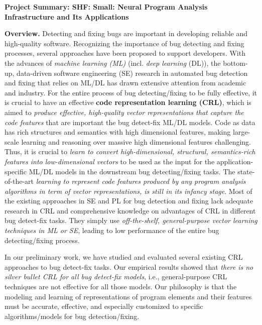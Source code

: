\documentclass[11pt]{article}
\begin{document}

\begin{center}
  {\bf Project Summary: SHF: Small: Neural Program Analysis Infrastructure and Its Applications}
\end{center}
\vspace{-.1in}


{\bf Overview.}
Detecting and fixing bugs are important in developing reliable and
high-quality software. Recognizing the importance of bug detecting and fixing processes,
several approaches have been proposed to support developers. With the
advances of {\em machine learning (ML)} (incl. {\em deep learning}
(DL)), the bottom-up, data-driven software engineering (SE) research
in automated bug detection and fixing that relies on ML/DL has drawn
extensive attention from academic and industry. For the entire process
of bug detecting/fixing to be fully effective, it is crucial to have
an effective {\bf code representation learning (CRL)}, which is aimed
to {\em produce effective, high-quality vector representations that
  capture the code features} that are important the bug detect-fix
ML/DL models. Code as data has rich structures and semantics with high
dimensional features, making large-scale learning and reasoning over
massive high dimensional features challenging. Thus, it is crucial to
{\em learn to convert high-dimensional, structural, semantics-rich
  features into low-dimensional vectors} to be used as the input for
the application-specific ML/DL models in the downstream bug
detecting/fixing tasks.  The state-of-the-art {\em learning to
  represent code features produced by any program analysis algorithms
  in term of vector representations, is still in its infancy
  stage}. Most of the existing approaches in SE and PL for bug
detection and fixing lack adequate research in CRL and comprehensive
knowledge on advantages of CRL in different bug detect-fix
tasks. They simply use {\em off-the-shelf, general-purpose vector
  learning techniques in ML or SE}, leading to low performance of the
entire bug detecting/fixing process.

In our preliminary work, we have studied and evaluated several
existing CRL approaches to bug detect-fix tasks. Our empirical results
showed that {\em there is no silver bullet CRL for all bug detect-fix
  models}, i.e., general-purpose CRL techniques are not effective for
all those models. Our philosophy is that the modeling and learning of
representations of program elements and their features must be
accurate, effective, and especially customized to specific
algorithms/models for bug detection/fixing.
\end{document}
